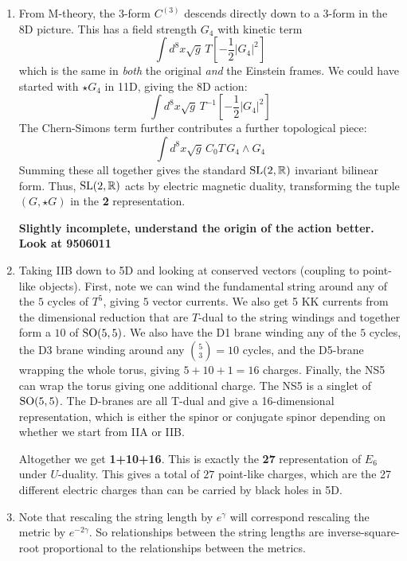 \documentclass[11pt, class=article, crop=false]{standalone}
\begin{document}
\begin{enumerate}
	From the M-theory perspective, the three distinct 2-form potentials come from wrapping the $C_3$ around different $T^3$ cycles from 11D. 
	
	\item From M-theory, the $3$-form $C^{(3)}$ descends directly down to a 3-form in the 8D picture. This has a field strength $G_4$ with kinetic term
	\[
		\int d^8 x \sqrt{g} \, T \left[- \frac12 |G_4|^2 \right] 
	\]
	which is the same in \emph{both} the original \emph{and} the Einstein frames. We could have started with $\star G_4$ in 11D, giving the 8D action:
	\[
		\int d^8 x \sqrt{g} \, T^{-1} \left[- \frac12 |G_4|^2 \right] 
	\]
	The Chern-Simons term further contributes a further topological piece:
	\[
		 \int d^8 x \sqrt{g}\, C_0 T \, G_4 \wedge G_4
	\]
	Summing these all together gives the standard $\mathrm{SL}(2, \mathbb{R})$ invariant bilinear form.  Thus, $\mathrm{SL}(2,\mathbb{R})$ acts by electric magnetic duality, transforming the tuple $(G, \star G)$ in the \textbf{2} representation. 
	
	\textbf{Slightly incomplete, understand the origin of the action better. Look at 9506011}
	
	\item Taking IIB down to 5D and looking at conserved vectors (coupling to point-like objects). First, note we can wind the fundamental string around any of the $5$ cycles of $T^5$, giving $5$ vector currents. We also get 5 KK currents from the dimensional reduction that are $T$-dual to the string windings and together form a $10$ of $\mathrm{SO}(5,5)$. We also have the D1 brane winding any of the $5$ cycles, the D3 brane winding around any ${5 \choose 3} = 10$ cycles, and the D5-brane wrapping the whole torus, giving $5 + 10 + 1 = 16$ charges. Finally, the NS5 can wrap the torus giving one additional charge. The NS5 is a singlet of $\mathrm{SO}(5,5)$. The D-branes are all T-dual and give a 16-dimensional representation, which is either the spinor or conjugate spinor depending on whether we start from IIA or IIB. 
	
	Altogether we get \textbf{1+10+16}. This is exactly the \textbf{27} representation of $E_6$ under $U$-duality. This gives a total of $27$ point-like charges, which are the 27 different electric charges than can be carried by black holes in 5D.
	
	\item Note that rescaling the string length by $e^\gamma$ will correspond rescaling the metric by $e^{-2\gamma}$. So relationships between the string lengths are inverse-square-root proportional to the relationships between the metrics.
	

\end{enumerate}
\end{document}
